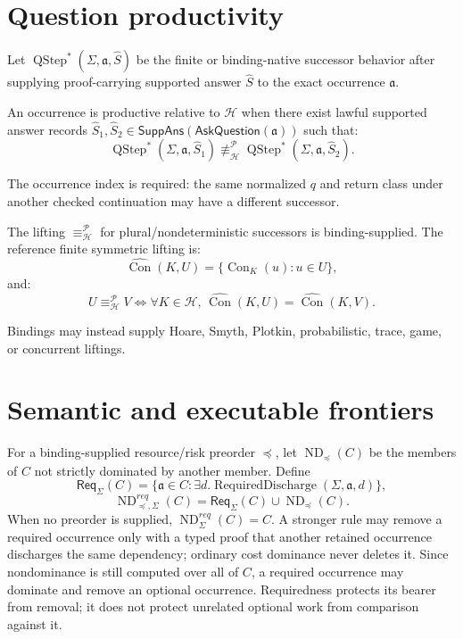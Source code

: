 \documentclass[11pt,oneside]{article}
\newcommand{\Con}{\operatorname{Con}}
\newcommand{\RequiredDischarge}{\operatorname{RequiredDischarge}}
\newcommand{\QStep}{\operatorname{QStep}}
\newcommand{\AskRef}{\mathfrak a}
\newcommand{\ND}{\operatorname{ND}}
\begin{document}
\section{Question productivity}

Let \(\QStep^\ast(\Sigma,\AskRef,\widehat S)\) be the finite or binding-native successor behavior
after supplying proof-carrying supported answer \(\widehat S\) to the exact occurrence
\(\AskRef\).

An occurrence is productive relative to \(\mathcal H\) when there exist lawful supported answer
records \(\widehat S_1,\widehat S_2\in
\mathsf{SuppAns}(\mathsf{AskQuestion}(\AskRef))\) such that:
\[
\boxed{
\QStep^\ast(\Sigma,\AskRef,\widehat S_1)
\not\equiv_{\mathcal H}^{\mathcal P}
\QStep^\ast(\Sigma,\AskRef,\widehat S_2).
}
\]

The occurrence index is required: the same normalized \(q\) and return class under another checked
continuation may have a different successor.

The lifting \(\equiv_{\mathcal H}^{\mathcal P}\) for plural/nondeterministic successors is binding-supplied.  The reference finite symmetric lifting is:
\[
\widehat{\Con}(K,U)
=
\{\Con_K(u):u\in U\},
\]
and:
\[
U\equiv_{\mathcal H}^{\mathcal P}V
\iff
\forall K\in\mathcal H,\,
\widehat{\Con}(K,U)=\widehat{\Con}(K,V).
\]

Bindings may instead supply Hoare, Smyth, Plotkin, probabilistic, trace, game, or concurrent liftings.

\section{Semantic and executable frontiers}

For a binding-supplied resource/risk preorder \(\preceq\), let \(\ND_{\preceq}(C)\) be the
members of \(C\) not strictly dominated by another member.  Define
\[
\mathsf{Req}_{\Sigma}(C)
=
\{\AskRef\in C:\exists d.\RequiredDischarge(\Sigma,\AskRef,d)\},
\]
\[
\boxed{
\ND_{\preceq,\Sigma}^{req}(C)
=
\mathsf{Req}_{\Sigma}(C)
\cup
\ND_{\preceq}(C).
}
\]
When no preorder is supplied, \(\ND_{\Sigma}^{req}(C)=C\).  A stronger rule may remove a required
occurrence only with a typed proof that another retained occurrence discharges the same dependency;
ordinary cost dominance never deletes it.  Since nondominance is still computed over all of \(C\),
a required occurrence may dominate and remove an optional occurrence.  Requiredness protects its
bearer from removal; it does not protect unrelated optional work from comparison against it.
\end{document}
